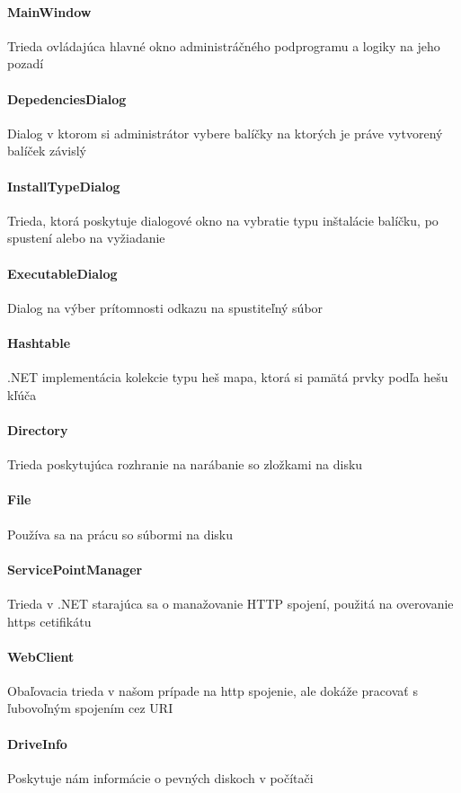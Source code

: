 \paragraph{MainWindow}
Trieda ovládajúca hlavné okno administráčného podprogramu a logiky na jeho pozadí
\paragraph{DepedenciesDialog}
Dialog v ktorom si administrátor vybere balíčky na ktorých je práve vytvorený balíček závislý
\paragraph{InstallTypeDialog}
Trieda, ktorá poskytuje dialogové okno na vybratie typu inštalácie balíčku, po spustení alebo na vyžiadanie
\paragraph{ExecutableDialog}
Dialog na výber prítomnosti odkazu na spustiteľný súbor
\paragraph{Hashtable}
.NET implementácia kolekcie typu heš mapa, ktorá si pamätá prvky podľa hešu kľúča
\paragraph{Directory}
Trieda poskytujúca rozhranie na narábanie so zložkami na disku
\paragraph{File}
Používa sa na prácu so súbormi na disku
\paragraph{ServicePointManager}
Trieda v .NET starajúca sa o manažovanie HTTP spojení, použitá na overovanie https cetifikátu
\paragraph{WebClient}
Obaľovacia trieda v našom prípade na http spojenie, ale dokáže pracovať s ľubovoľným spojením cez URI
\paragraph{DriveInfo}
Poskytuje nám informácie o pevných diskoch v počítači
